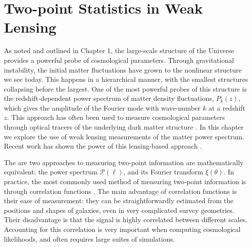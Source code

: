 \section{Two-point Statistics in Weak Lensing}
\label{sec:lensing_intro}
As noted and outlined in Chapter 1, the large-scale structure
of the Universe provides a powerful probe of
cosmological parameters.  Through gravitational instability, the initial
matter fluctuations have grown to the nonlinear structure we see today.
This happens in a hierarchical manner, with the smallest structures
collapsing before the largest.  One of the most powerful probes of this
structure is the redshift-dependent power spectrum of matter density
fluctuations, $P_k(z)$, which gives the amplitude of the
Fourier mode with wave-number $k$ at a redshift $z$. 
This approach has often been used to measure cosmological parameters
through optical tracers of the underlying dark matter structure
\citep[e.g.][]{Tegmark06}.  In this chapter we explore the use of
weak lensing measurements of the matter power spectrum.
Recent work has shown the power of this lensing-based
approach \citep{Ichiki09, Schrabback10}.

The are two approaches to measuring two-point information are 
mathematically equivalent: the power spectrum $\mathcal{P}(\ell)$,
and its Fourier transform $\xi(\theta)$.  In practice,
the most commonly used method of measuring two-point information
is through correlation functions \citep[see][]{Schneider02}.
The main advantage of correlation functions is their ease of measurement:
they can be straightforwardly estimated from the positions and shapes of
galaxies, even in very complicated survey geometries.
Their disadvantage is that the
signal is highly correlated between different scales.  Accounting for this 
correlation is very important when computing cosmological likelihoods,
and often requires large suites of simulations.

